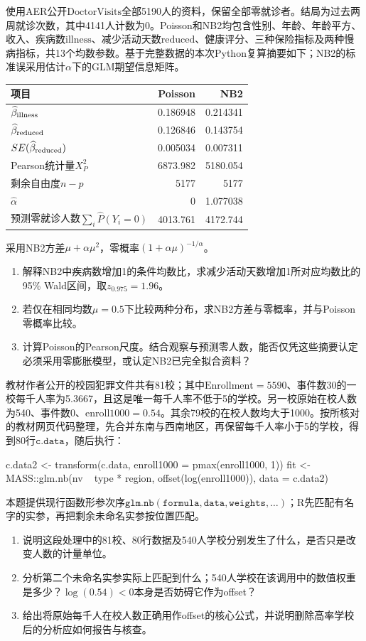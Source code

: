 使用AER公开$\mathrm{DoctorVisits}$全部5190人的资料，保留全部零就诊者。结局为过去两周就诊次数，其中4141人计数为0。Poisson和NB2均包含性别、年龄、年龄平方、收入、疾病数$\mathrm{illness}$、减少活动天数$\mathrm{reduced}$、健康评分、三种保险指标及两种慢病指标，共13个均数参数。基于完整数据的本次Python复算摘要如下；NB2的标准误采用估计$\alpha$下的GLM期望信息矩阵。\begin{center}\small\begin{tabular}{@{}lrr@{}}\toprule 项目 & Poisson & NB2\\\midrule $\widehat\beta_{\rm illness}$ & 0.186948 & 0.214341\\$\widehat\beta_{\rm reduced}$ & 0.126846 & 0.143754\\$SE(\widehat\beta_{\rm reduced})$ & 0.005034 & 0.007311\\Pearson统计量$X_P^2$ & 6873.982 & 5180.054\\剩余自由度$n-p$ & 5177 & 5177\\$\widehat\alpha$ & 0 & 1.077038\\预测零就诊人数$\sum_i\widehat P(Y_i=0)$ & 4013.761 & 4172.744\\\bottomrule\end{tabular}\end{center}采用NB2方差$\mu+\alpha\mu^2$，零概率$(1+\alpha\mu)^{-1/\alpha}$。\begin{enumerate}\item 解释NB2中疾病数增加1的条件均数比，求减少活动天数增加1所对应均数比的95\% Wald区间，取$z_{0.975}=1.96$。\item 若仅在相同均数$\mu=0.5$下比较两种分布，求NB2方差与零概率，并与Poisson零概率比较。\item 计算Poisson的Pearson尺度。结合观察与预测零人数，能否仅凭这些摘要认定必须采用零膨胀模型，或认定NB2已完全拟合资料？\end{enumerate}

教材作者公开的校园犯罪文件共有81校；其中$\mathrm{Enrollment}=5590$、事件数30的一校每千人率为5.3667，且这是唯一每千人率不低于5的学校。另一校原始在校人数为540、事件数0、$\mathrm{enroll1000}=0.54$。其余79校的在校人数均大于1000。按所核对的教材网页代码整理，先合并东南与西南地区，再保留每千人率小于5的学校，得到80行$\mathtt{c.data}$，随后执行：
\begin{rcode}
c.data2 <- transform(c.data,
  enroll1000 = pmax(enroll1000, 1))
fit <- MASS::glm.nb(nv ~ type * region,
  offset(log(enroll1000)), data = c.data2)
\end{rcode}
本题提供现行函数形参次序$\mathtt{glm.nb(formula,data,weights,\ldots)}$；R先匹配有名字的实参，再把剩余未命名实参按位置匹配。\begin{enumerate}\item 说明这段处理中的81校、80行数据及540人学校分别发生了什么，是否只是改变人数的计量单位。\item 分析第二个未命名实参实际上匹配到什么；540人学校在该调用中的数值权重是多少？$\log(0.54)<0$本身是否妨碍它作为offset？\item 给出将原始每千人在校人数正确用作offset的核心公式，并说明删除高率学校后的分析应如何报告与核查。\end{enumerate}

